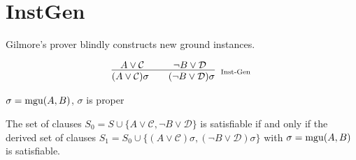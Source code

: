 \section{InstGen}

Gilmore's prover blindly constructs new ground instances. 

\begin{definition}
	\begin{gather*}
	\infer
	[\atop\text{Inst-Gen}] 
	{(A\lor\mathcal C)\sigma\qquad (\lnot B\lor\mathcal D)\sigma}
	{A\lor\mathcal C\quad&\quad \lnot B\lor\mathcal D}
	\end{gather*}
	\begin{center}$\sigma=\operatorname{mgu}(A,B)$, $\sigma$ is proper\end{center}
\end{definition}

\begin{lemma}
	The set of clauses 
	$S_0 = S \cup
	\{ 
		 A\lor\mathcal C, \lnot B\lor\mathcal D
	\}$ 
	is satisfiable if and only if
	the derived set of clauses 
	$S_1 = S_0 \cup \{ (A\lor\mathcal C)\sigma, (\lnot B\lor\mathcal D)\sigma\}$
	with $\sigma = \operatorname{mgu}(A,B)$ 
	is satisfiable.
\end{lemma}

